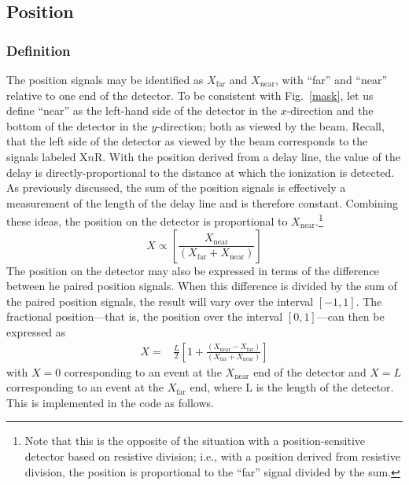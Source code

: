 \subsection{Position}
\subsubsection{Definition}
The position signals may be  identified as $X_\mathrm{far}$ and $X_\mathrm{near}$, with ``far'' and ``near'' relative to one end of the detector.  To be consistent with Fig.~\ref{mask}, let us define ``near'' as the left-hand side of the detector in the $x$-direction and the bottom of the detector in the $y$-direction; both as viewed by the beam.  Recall, that the left side of the detector as viewed by the beam corresponds to the signals labeled X$n$R.
With the position derived from a delay line, the value of the delay is directly-proportional to the distance at which the ionization is detected.  As previously discussed, the sum of the position signals is effectively a measurement of the length of the delay line and is therefore constant.  %
Combining these ideas, the position on the detector is proportional to $X_\mathrm{near}$.\footnote{Note that this is the opposite of the situation with a position-sensitive detector based on resistive division; i.e., with a position derived from resistive division, the position is proportional to the ``far'' signal divided by the sum.}
\begin{equation}
X\propto\left[\frac{X_\mathrm{near}}{(X_\mathrm{far}+X_\mathrm{near})}\right]
\label{detector_prop}
\end{equation}
The position on the detector may also be expressed in terms of the difference between he paired position signals.  When this difference is divided by the sum of the paired position signals, the result will vary over the interval $[-1,1]$.  The fractional position---that is, the position  over the interval $[0,1]$---can then be expressed as
\begin{equation}
\begin{split}
X=&\frac{L}{2}\left[1+\frac{(X_\mathrm{near}-X_\mathrm{far})}{(X_\mathrm{far}+X_\mathrm{near})}\right]
\label{detector_X}
\end{split}
\end{equation}
with $X=0$ corresponding to an event at the $X_\mathrm{near}$ end of the detector and $X=L$ corresponding to an event at the $X_\mathrm{far}$ end, where L is the length of the detector.  This is implemented in the code as follows.
